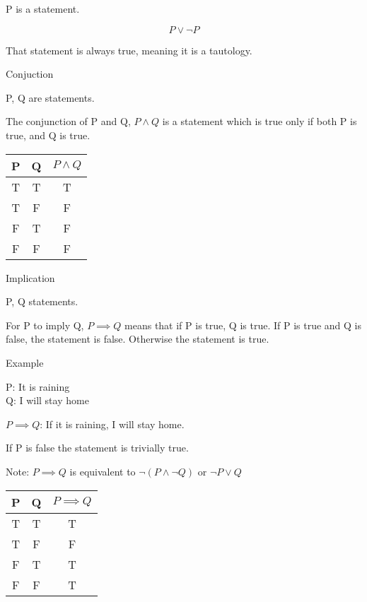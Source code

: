 \documentclass{report}
\begin{document}
\begin{description}
        P is a statement.

        \begin{displaymath}
            P \lor \neg P
        \end{displaymath}

        That statement is always true, meaning it is
        a tautology.
    \item Conjuction

        P, Q are statements.

        The conjunction of P and Q, $P \land Q$
        is a statement which is true only if both
        P is true, and Q is true.

        \begin{tabular}{|c|c|c|}
            \hline
            P & Q & $P \land Q$\\ 
            \hline
            T & T & T\\
            \hline
            T & F & F\\
            \hline
            F & T & F\\
            \hline
            F & F & F\\
            \hline
        \end{tabular}

    \item Implication

        P, Q statements.

        For P to imply Q, $P \implies Q$ means that
        if P is true, Q is true. If P is true and Q is false,
        the statement is false. Otherwise the statement is true.
    
    \pagebreak
    \item Example

        P: It is raining\\
        Q: I will stay home

        $P \implies Q$: If it is raining, I will stay home.

        If P is false the statement is trivially true.

        \begin{mdframed}
            Note: $P \implies Q$ is equivalent to
            $\neg (P \land \neg Q)$ or
            $\neg P \lor Q$
        \end{mdframed}

        \begin{tabular}{|c|c|c|}
            \hline
            P & Q & $P \implies Q$\\ 
            \hline
            T & T & T\\
            \hline
            T & F & F\\
            \hline
            F & T & T\\
            \hline
            F & F & T\\
            \hline
        \end{tabular} 


\end{description}
\end{document}
